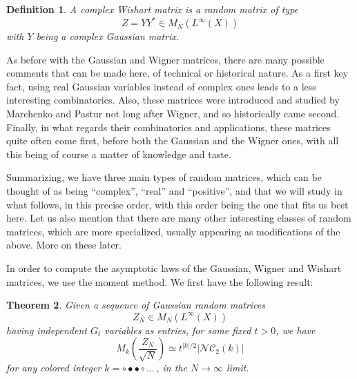 \documentclass[12pt]{amsbook}
\newtheorem{theorem}{Theorem}[chapter]
\newtheorem{definition}[theorem]{Definition}
\begin{document}

\begin{definition}
A complex Wishart matrix is a random matrix of type
$$Z=YY^*\in M_N(L^\infty(X))$$
with $Y$ being a complex Gaussian matrix.
\end{definition}

As before with the Gaussian and Wigner matrices, there are many possible comments that can be made here, of technical or historical nature. As a first key fact, using real Gaussian variables instead of complex ones leads to a less interesting combinatorics. Also, these matrices were introduced and studied by Marchenko and Pastur not long after Wigner, and so historically came second. Finally, in what regards their combinatorics and applications, these matrices quite often come first, before both the Gaussian and the Wigner ones, with all this being of course a matter of knowledge and taste.

\bigskip

Summarizing, we have three main types of random matrices, which can be thought of as being ``complex'', ``real'' and ``positive'', and that we will study in what follows, in this precise order, with this order being the one that fits us best here. Let us also mention that there are many other interesting classes of random matrices, which are more specialized, usually appearing as modifications of the above. More on these later.

\bigskip

In order to compute the asymptotic laws of the Gaussian, Wigner and Wishart matrices, we use the moment method. We first have the following result:


\begin{theorem}
Given a sequence of Gaussian random matrices
$$Z_N\in M_N(L^\infty(X))$$
having independent $G_t$ variables as entries, for some fixed $t>0$, we have
$$M_k\left(\frac{Z_N}{\sqrt{N}}\right)\simeq t^{|k|/2}|\mathcal{NC}_2(k)|$$
for any colored integer $k=\circ\bullet\bullet\circ\ldots\,$, in the $N\to\infty$ limit.
\end{theorem}
\end{document}
